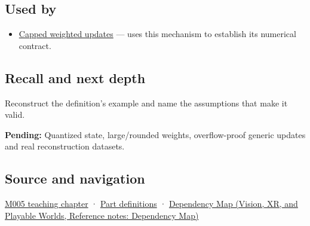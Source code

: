 \subsection{Used by}\label{appendix-260182e617b7-used-by}

\hypertarget{appendix-260182e617b7-used-by}{}

\begin{itemize}
\tightlist
\item
  \hyperref[appendix-1e45d0613db3]{Capped weighted updates} --- uses this mechanism to establish its numerical contract.
\end{itemize}

\subsection{Recall and next depth}\label{appendix-260182e617b7-recall-and-next-depth}

\hypertarget{appendix-260182e617b7-recall-and-next-depth}{}

Reconstruct the definition's example and name the assumptions that make it valid.

\textbf{Pending:} Quantized state, large/rounded weights, overflow-proof generic updates and real reconstruction datasets.

\subsection{Source and navigation}\label{appendix-260182e617b7-source-and-navigation}

\hypertarget{appendix-260182e617b7-source-and-navigation}{}

\hyperref[01-foundations-i-ch001-when-arithmetic-meets-uncertainty]{M005 teaching chapter} · \hyperref[appendix-fd090d982a15-m005---parts-77-88]{Part definitions} · \href{../07-Vision-XR-and-Playable-Worlds/main.pdf\#nameddest=appendix-4ad47bdd269a}{Dependency Map (Vision, XR, and Playable Worlds, Reference notes: Dependency Map)}
